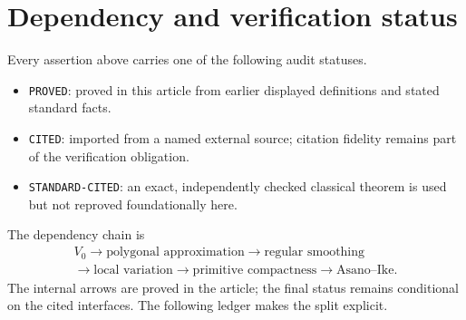 \documentclass[11pt]{article}
\theoremstyle{definition}
\theoremstyle{remark}
\begin{document}
\appendix

\section{Dependency and verification status}

Every assertion above carries one of the following audit statuses.
\begin{itemize}
\item \texttt{PROVED}: proved in this article from earlier displayed
  definitions and stated standard facts.
\item \texttt{CITED}: imported from a named external source; citation
  fidelity remains part of the verification obligation.
\item \texttt{STANDARD-CITED}: an exact, independently checked classical
  theorem is used but not reproved foundationally here.
\end{itemize}
The dependency chain is
\[
\begin{gathered}
 V_0\longrightarrow\text{polygonal approximation}
 \longrightarrow\text{regular smoothing}\\
 \longrightarrow\text{local variation}
 \longrightarrow\text{primitive compactness}
 \longrightarrow\text{Asano--Ike}.
\end{gathered}
\]
The internal arrows are proved in the article; the final status remains
conditional on the cited interfaces.  The following ledger makes the split
explicit.
\end{document}
